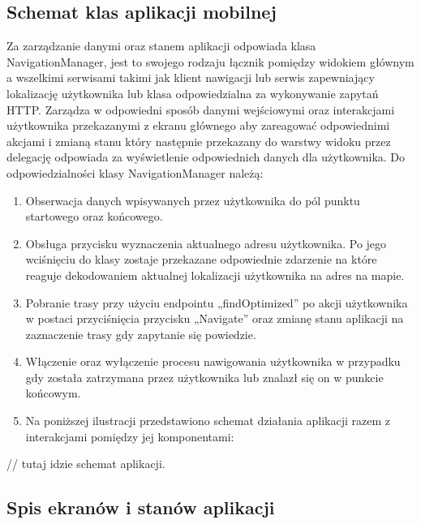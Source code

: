 \subsection{Schemat klas aplikacji mobilnej}

Za zarządzanie danymi oraz stanem aplikacji odpowiada klasa NavigationManager, jest to swojego rodzaju łącznik pomiędzy widokiem głównym a wszelkimi serwisami takimi jak klient nawigacji lub serwis zapewniający lokalizację użytkownika lub klasa odpowiedzialna za wykonywanie zapytań HTTP. Zarządza w odpowiedni sposób danymi wejściowymi oraz interakcjami użytkownika przekazanymi z ekranu głównego aby zareagować odpowiednimi akcjami i zmianą stanu który następnie przekazany do warstwy widoku przez delegację odpowiada za wyświetlenie odpowiednich danych dla użytkownika. Do odpowiedzialności klasy NavigationManager należą:

\begin{enumerate}
\item Obserwacja danych wpisywanych przez użytkownika do pól punktu startowego oraz końcowego.
\item Obsługa przycisku wyznaczenia aktualnego adresu użytkownika. Po jego wciśnięciu do klasy zostaje przekazane odpowiednie zdarzenie na które reaguje dekodowaniem aktualnej lokalizacji użytkownika na adres na mapie.
\item Pobranie trasy przy użyciu endpointu „findOptimized” po akcji użytkownika w postaci przyciśnięcia przycisku „Navigate” oraz zmianę stanu aplikacji na zaznaczenie trasy gdy zapytanie się powiedzie.
\item Włączenie oraz wyłączenie procesu nawigowania użytkownika w przypadku gdy została zatrzymana przez użytkownika lub znalazł się on w punkcie końcowym.
\item Na poniższej ilustracji przedstawiono schemat działania aplikacji razem z interakcjami pomiędzy jej komponentami:
\end{enumerate}

// tutaj idzie schemat aplikacji.

\subsection{Spis ekranów i stanów aplikacji}

